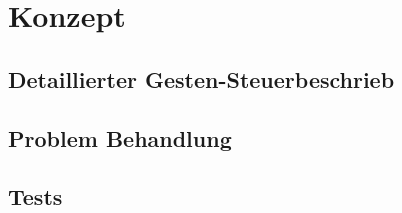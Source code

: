 \chapter{Konzept}

\section{Detaillierter Gesten-Steuerbeschrieb}

\section{Problem Behandlung}

\section{Tests}


